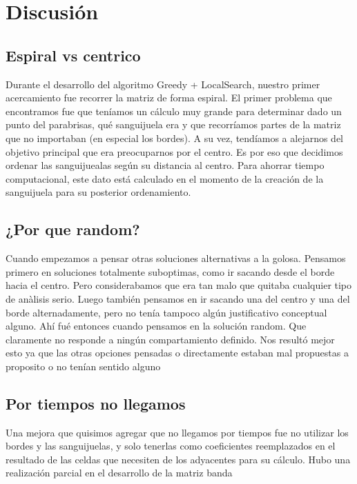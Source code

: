 \section{Discusi\'on}

\subsection{Espiral vs centrico}
	Durante el desarrollo del algoritmo Greedy + LocalSearch, nuestro primer acercamiento fue recorrer la matriz de forma espiral. El primer problema que encontramos fue que teníamos un cálculo muy grande para determinar dado un punto del parabrisas, qué sanguijuela era y que recorríamos partes de la matriz que no importaban (en especial los bordes). A su vez, tendíamos a alejarnos del objetivo principal que era preocuparnos por el centro. Es por eso que decidimos ordenar las sanguijuealas según su distancia al centro. Para ahorrar tiempo computacional, este dato está calculado en el momento de la creación de la sanguijuela para su posterior ordenamiento.

\subsection{¿Por que random?}

Cuando empezamos a pensar otras soluciones alternativas a la golosa. Pensamos primero en soluciones totalmente suboptimas, como ir sacando desde el borde hacia el centro. Pero considerabamos que era tan malo que quitaba cualquier tipo de anàlisis serio. Luego también pensamos en ir sacando una del centro y una del borde alternadamente, pero no tenía tampoco algún justificativo conceptual alguno. Ahí fué entonces cuando pensamos en la solución random. Que claramente no responde a ningún compartamiento definido. Nos resultó mejor esto ya que las otras opciones pensadas o directamente estaban mal propuestas a proposito o no tenían sentido alguno


\subsection{Por tiempos no llegamos}
  Una mejora que quisimos agregar que no llegamos por tiempos fue no utilizar los bordes y las sanguijuelas, y solo tenerlas como coeficientes reemplazados en el resultado de las celdas que necesiten de los adyacentes para su cálculo. Hubo una realización parcial en el desarrollo de la matriz banda










